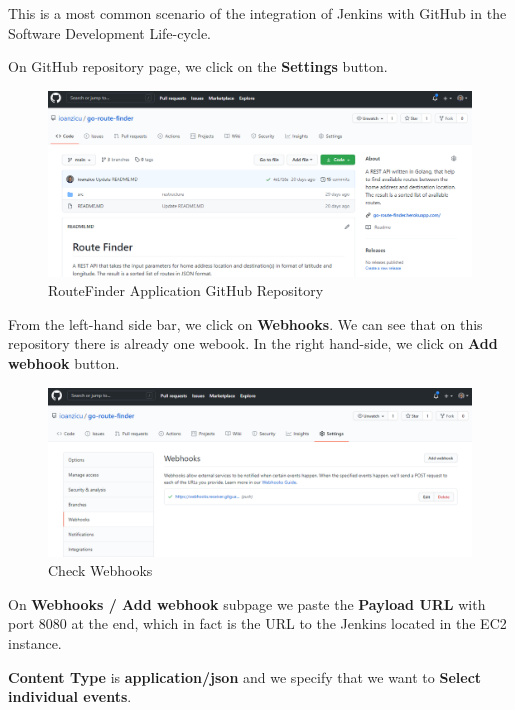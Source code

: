 \documentclass[12pt,a4paper,twoside]{article}
\begin{document}
This is a most common scenario of the integration of Jenkins with GitHub in the Software Development Life-cycle.


On GitHub repository page, we click on the \textbf{Settings} button.


\begin{figure}[H]
    \centering
        \includegraphics[width=15cm]{images-aws/40-github-project.png}
        \caption{RouteFinder Application GitHub Repository}
\end{figure}


From the left-hand side bar, we click on \textbf{Webhooks}. We can see that on this repository there is already one webook. In the right hand-side, we click on \textbf{Add webhook} button.


\begin{figure}[H]
    \centering
        \includegraphics[width=15cm]{images-aws/41-web-hook.png}
        \caption{Check Webhooks}
\end{figure}


On \textbf{Webhooks / Add webhook} subpage we paste the \textbf{Payload URL}  with port 8080 at the end, which in fact is the URL to the Jenkins located in the EC2 instance.


\textbf{Content Type} is \textbf{application/json} and we specify that we want to \textbf{Select individual events}.
\end{document}

